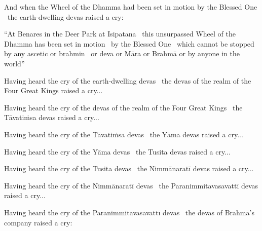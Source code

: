 \begin{english-only-hang}
  And when the Wheel of the Dhamma had been set in motion by the Blessed One \breathmark\ the earth-dwelling devas raised a cry:
\end{english-only-hang}

\begin{english-only-hang}
  ``At Benares in the Deer Park at Isipatana \breathmark\ this unsurpassed Wheel of the Dhamma has been set in motion \breathmark\ by the Blessed One \breathmark\ which cannot be stopped by any ascetic or brahmin \breathmark\ or deva or Māra or Brahmā or by anyone in the world''
\end{english-only-hang}

\begin{english-only-hang}
  Having heard the cry of the earth-dwelling devas \breathmark\ the devas of the realm of the Four Great Kings raised a cry...
\end{english-only-hang}

\begin{english-only-hang}
  Having heard the cry of the devas of the realm of the Four Great Kings \breathmark\ the Tāvatiṁsa devas raised a cry...
\end{english-only-hang}

\begin{english-only-hang}
  Having heard the cry of the Tāvatiṁsa devas \breathmark\ the Yāma devas raised a cry...
\end{english-only-hang}

\begin{english-only-hang}
  Having heard the cry of the Yāma devas \breathmark\ the Tusita devas raised a cry...
\end{english-only-hang}

\begin{english-only-hang}
  Having heard the cry of the Tusita devas \breathmark\ the Nimmānaratī devas raised a cry...
\end{english-only-hang}

\begin{english-only-hang}
  Having heard the cry of the Nimmānaratī devas \breathmark\ the Paranimmitavasavattī devas raised a cry...
\end{english-only-hang}

\begin{english-only-hang}
  Having heard the cry of the Paranimmitavasavattī devas \breathmark\ the devas of Brahmā's company raised a cry:
\end{english-only-hang}

